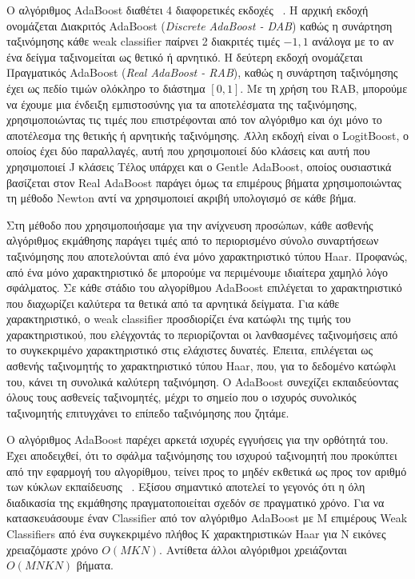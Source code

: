 Ο αλγόριθμος AdaBoost διαθέτει 4 διαφορετικές εκδοχές ~\cite{Friedman98additivelogistic}.
Η αρχική εκδοχή ονομάζεται ∆ιακριτός AdaBoost (\emph{Discrete AdaBoost - DAB}) καθώς η συνάρτηση ταξινόμησης
κάθε weak classifier παίρνει 2 διακριτές τιμές ${-1,1}$ ανάλογα με το αν ένα
δείγμα ταξινομείται ως θετικό ή αρνητικό. Η δεύτερη εκδοχή ονομάζεται Πραγματικός AdaBoost
(\emph{Real AdaBoost - RAB}), καθώς η συνάρτηση ταξινόμησης έχει ως πεδίο τιμών ολόκληρο
το διάστημα $[0,1]$. Με τη χρήση του RAB, μπορούμε να έχουμε μια
ένδειξη εμπιστοσύνης για τα αποτελέσματα της ταξινόμησης, χρησιμοποιώντας τις τιμές που
επιστρέφονται από τον αλγόριθμο και όχι μόνο το αποτέλεσμα της θετικής ή αρνητικής
ταξινόμησης. Άλλη εκδοχή είναι ο LogitBoost, ο οποίος έχει δύο παραλλαγές, αυτή που
χρησιμοποιεί δύο κλάσεις και αυτή που χρησιμοποιεί J κλάσεις
Τέλος υπάρχει και ο Gentle AdaBoost, οποίος ουσιαστικά βασίζεται στον Real AdaBoost
παράγει όμως τα επιμέρους βήματα χρησιμοποιώντας τη μέθοδο Newton αντί να χρησιμοποιεί
ακριβή υπολογισμό σε κάθε βήμα.

Στη μέθοδο που χρησιμοποιήσαμε για την ανίχνευση προσώπων, κάθε ασθενής αλγόριθμος
εκμάθησης παράγει τιμές από το περιορισμένο σύνολο συναρτήσεων ταξινόμησης που αποτελούνται από ένα
μόνο χαρακτηριστικό τύπου Haar. Προφανώς, από ένα μόνο χαρακτηριστικό δε μπορούμε να
περιμένουμε ιδιαίτερα χαμηλό λόγο σφάλματος. Σε κάθε στάδιο του αλγορίθμου AdaBoost
επιλέγεται το χαρακτηριστικό που διαχωρίζει καλύτερα τα θετικά από τα αρνητικά δείγματα. Για
κάθε χαρακτηριστικό, ο weak classifier προσδιορίζει ένα κατώφλι της τιμής του
χαρακτηριστικού, που ελέγχοντάς το περιορίζονται οι λανθασμένες ταξινομήσεις από το
συγκεκριμένο χαρακτηριστικό στις ελάχιστες δυνατές. Έπειτα, επιλέγεται ως ασθενής ταξινομητής
το χαρακτηριστικό τύπου Haar, που, για το δεδομένο κατώφλι του, κάνει τη συνολικά καλύτερη
ταξινόμηση. Ο AdaBoost συνεχίζει εκπαιδεύοντας όλους τους ασθενείς ταξινομητές, μέχρι το
σημείο που ο ισχυρός συνολικός ταξινομητής επιτυγχάνει το επίπεδο ταξινόμησης που ζητάμε.

Ο αλγόριθμος AdaBoost παρέχει αρκετά ισχυρές εγγυήσεις για την ορθότητά του. Έχει
αποδειχθεί, ότι το σφάλμα ταξινόμησης του ισχυρού ταξινομητή που προκύπτει από την εφαρμογή
του αλγορίθμου, τείνει προς το μηδέν εκθετικά ως προς τον αριθμό των κύκλων εκπαίδευσης
~\cite{schapire1998}. Εξίσου σημαντικό αποτελεί το γεγονός ότι η όλη διαδικασία της
εκμάθησης πραγματοποιείται  σχεδόν σε πραγματικό χρόνο.
Για να κατασκευάσουμε έναν Classifier από τον αλγόριθμο AdaBoost με Μ επιμέρους
Weak Classifiers από ένα συγκεκριμένο πλήθος Κ χαρακτηριστικών Haar για Ν εικόνες
χρειαζόμαστε χρόνο $O(MKN)$. Αντίθετα άλλοι αλγόριθμοι χρειάζονται $O(MNKN)$ βήματα.

